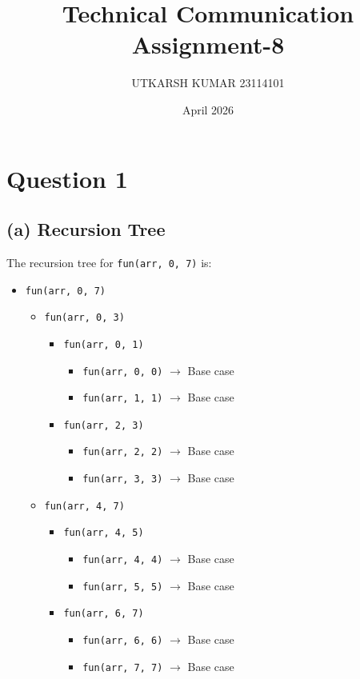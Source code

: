 \documentclass[11pt]{article}
\title{Technical Communication Assignment-8}
\author{UTKARSH KUMAR 23114101}
\date{April 2026}
\begin{document}
\maketitle

\section*{Question 1}

\subsection*{(a) Recursion Tree}
The recursion tree for \texttt{fun(arr, 0, 7)} is:

\begin{itemize}
    \item \texttt{fun(arr, 0, 7)} \quad [\texttt{mid = 3}]
    \begin{itemize}
        \item \texttt{fun(arr, 0, 3)} \quad [\texttt{mid = 1}]
        \begin{itemize}
            \item \texttt{fun(arr, 0, 1)} \quad [\texttt{mid = 0}]
            \begin{itemize}
                \item \texttt{fun(arr, 0, 0)} \quad $\to$ Base case
                \item \texttt{fun(arr, 1, 1)} \quad $\to$ Base case
            \end{itemize}
            \item \texttt{fun(arr, 2, 3)} \quad [\texttt{mid = 2}]
            \begin{itemize}
                \item \texttt{fun(arr, 2, 2)} \quad $\to$ Base case
                \item \texttt{fun(arr, 3, 3)} \quad $\to$ Base case
            \end{itemize}
        \end{itemize}
        \item \texttt{fun(arr, 4, 7)} \quad [\texttt{mid = 5}]
        \begin{itemize}
            \item \texttt{fun(arr, 4, 5)} \quad [\texttt{mid = 4}]
            \begin{itemize}
                \item \texttt{fun(arr, 4, 4)} \quad $\to$ Base case
                \item \texttt{fun(arr, 5, 5)} \quad $\to$ Base case
            \end{itemize}
            \item \texttt{fun(arr, 6, 7)} \quad [\texttt{mid = 6}]
            \begin{itemize}
                \item \texttt{fun(arr, 6, 6)} \quad $\to$ Base case
                \item \texttt{fun(arr, 7, 7)} \quad $\to$ Base case
            \end{itemize}
        \end{itemize}
    \end{itemize}
\end{itemize}
\end{document}
